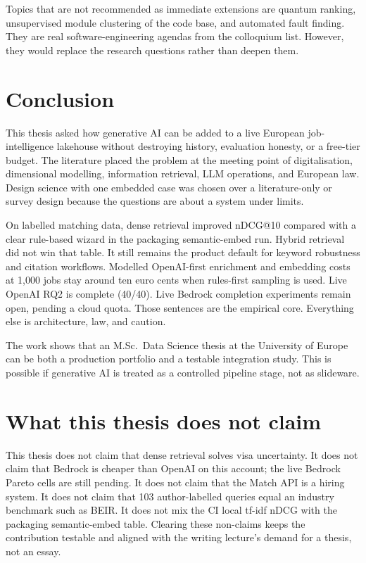 Topics that are not recommended as immediate extensions are quantum ranking, unsupervised module clustering of the code base, and automated fault finding. They are real software-engineering agendas from the colloquium list. However, they would replace the research questions rather than deepen them.

\section{Conclusion}
\label{sec:conclusion}

This thesis asked how generative AI can be added to a live European job-intelligence lakehouse without destroying history, evaluation honesty, or a free-tier budget. The literature placed the problem at the meeting point of digitalisation, dimensional modelling, information retrieval, LLM operations, and European law. Design science with one embedded case was chosen over a literature-only or survey design because the questions are about a system under limits.

On labelled matching data, dense retrieval improved nDCG@10 compared with a clear rule-based wizard in the packaging semantic-embed run. Hybrid retrieval did not win that table. It still remains the product default for keyword robustness and citation workflows. Modelled OpenAI-first enrichment and embedding costs at 1{,}000 jobs stay around ten euro cents when rules-first sampling is used. Live OpenAI RQ2 is complete (40/40). Live Bedrock completion experiments remain open, pending a cloud quota. Those sentences are the empirical core. Everything else is architecture, law, and caution.

The work shows that an M.Sc.\ Data Science thesis at the University of Europe can be both a production portfolio and a testable integration study. This is possible if generative AI is treated as a controlled pipeline stage, not as slideware.

\section{What this thesis does not claim}
\label{sec:nonclaims}

This thesis does not claim that dense retrieval solves visa uncertainty. It does not claim that Bedrock is cheaper than OpenAI on this account; the live Bedrock Pareto cells are still pending. It does not claim that the Match API is a hiring system. It does not claim that 103 author-labelled queries equal an industry benchmark such as BEIR. It does not mix the CI local tf-idf nDCG with the packaging semantic-embed table. Clearing these non-claims keeps the contribution testable and aligned with the writing lecture's demand for a thesis, not an essay.


